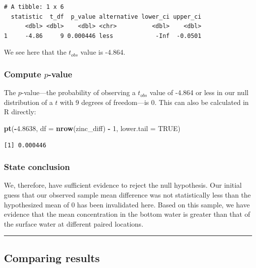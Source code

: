 \documentclass[12pt,]{krantz}
\makeatletter
\newenvironment{Shaded}{\begin{snugshade}}{\end{snugshade}}
\newcommand{\KeywordTok}[1]{\textcolor[rgb]{0.27,0.27,0.27}{\textbf{#1}}}
\newcommand{\DataTypeTok}[1]{\textcolor[rgb]{0.27,0.27,0.27}{#1}}
\newcommand{\DecValTok}[1]{\textcolor[rgb]{0.06,0.06,0.06}{#1}}
\newcommand{\FloatTok}[1]{\textcolor[rgb]{0.06,0.06,0.06}{#1}}
\newcommand{\StringTok}[1]{\textcolor[rgb]{0.5,0.5,0.5}{#1}}
\newcommand{\OtherTok}[1]{\textcolor[rgb]{0.37,0.37,0.37}{#1}}
\newcommand{\OperatorTok}[1]{\textcolor[rgb]{0.43,0.43,0.43}{\textbf{#1}}}
\newcommand{\NormalTok}[1]{#1}
\newenvironment{kframe}{%
\medskip{}
\setlength{\fboxsep}{.8em}
 \def\at@end@of@kframe{}%
 \ifinner\ifhmode%
  \def\at@end@of@kframe{\end{minipage}}%
  \begin{minipage}{\columnwidth}%
 \fi\fi%
 \def\FrameCommand##1{\hskip\@totalleftmargin \hskip-\fboxsep
 \colorbox{shadecolor}{##1}\hskip-\fboxsep
     \hskip-\linewidth \hskip-\@totalleftmargin \hskip\columnwidth}%
 \MakeFramed {\advance\hsize-\width
   \@totalleftmargin\z@ \linewidth\hsize
   \@setminipage}}%
 {\par\unskip\endMakeFramed%
 \at@end@of@kframe}
\renewenvironment{Shaded}{\begin{kframe}}{\end{kframe}}
\makeatother
\begin{document}
\begin{verbatim}
# A tibble: 1 x 6
  statistic  t_df  p_value alternative lower_ci upper_ci
      <dbl> <dbl>    <dbl> <chr>          <dbl>    <dbl>
1     -4.86     9 0.000446 less            -Inf  -0.0501
\end{verbatim}

We see here that the \(t_{obs}\) value is -4.864.

\subsubsection*{\texorpdfstring{Compute
\(p\)-value}{Compute p-value}}\label{compute-p-value-2}


The \(p\)-value---the probability of observing a \(t_{obs}\) value of
-4.864 or less in our null distribution of a \(t\) with 9 degrees of
freedom---is 0. This can also be calculated in R directly:

\begin{Shaded}
\begin{Highlighting}[]
\KeywordTok{pt}\NormalTok{(}\OperatorTok{-}\FloatTok{4.8638}\NormalTok{, }\DataTypeTok{df =} \KeywordTok{nrow}\NormalTok{(zinc_diff) }\OperatorTok{-}\StringTok{ }\DecValTok{1}\NormalTok{, }\DataTypeTok{lower.tail =} \OtherTok{TRUE}\NormalTok{)}
\end{Highlighting}
\end{Shaded}

\begin{verbatim}
[1] 0.000446
\end{verbatim}

\subsubsection*{State conclusion}\label{state-conclusion-4}


We, therefore, have sufficient evidence to reject the null hypothesis.
Our initial guess that our observed sample mean difference was not
statistically less than the hypothesized mean of 0 has been invalidated
here. Based on this sample, we have evidence that the mean concentration
in the bottom water is greater than that of the surface water at
different paired locations.

\begin{center}\rule{0.5\linewidth}{\linethickness}\end{center}

\subsection{Comparing results}\label{comparing-results-4}
\end{document}

